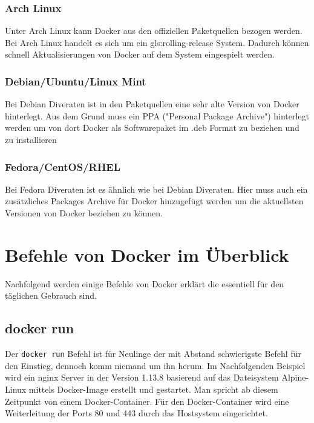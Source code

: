\subsubsection{Arch Linux}%
\label{sec:docker.installation.arch-linux}
Unter Arch Linux kann Docker aus den offiziellen Paketquellen bezogen werden. Bei Arch Linux handelt es sich um ein \Gls{gls:rolling-release} System. Dadurch können schnell Aktualisierungen von Docker auf dem System eingespielt werden.


\subsubsection{Debian/Ubuntu/Linux Mint}%
\label{sec:docker.installation.debian}
Bei Debian Diveraten ist in den Paketquellen eine sehr alte Version von Docker hinterlegt. Aus dem Grund muss ein PPA ("Personal Package Archive") hinterlegt werden um von dort Docker als Softwarepaket im .deb Format zu beziehen und zu installieren


\subsubsection{Fedora/CentOS/RHEL}%
\label{sec:docker.installation.fedora}
Bei Fedora Diveraten ist es ähnlich wie bei Debian Diveraten. Hier muss auch ein zusätzliches Packages Archive für Docker hinzugefügt werden um die aktuellsten Versionen von Docker beziehen zu können.


\section{Befehle von Docker im Überblick}%
\label{sec:docker-befehle}
Nachfolgend werden einige Befehle von Docker erklärt die essentiell für den täglichen Gebrauch sind.

\subsection{docker run}%
\label{sec:docker-befehle.run}
Der \texttt{docker run} Befehl ist für Neulinge der mit Abstand schwierigste Befehl für den Einstieg, dennoch komm niemand um ihn herum. Im Nachfolgenden Beispiel wird ein nginx Server in der Version 1.13.8 basierend auf das Dateisystem Alpine-Linux mittels Docker-Image erstellt und gestartet. Man spricht ab diesem Zeitpunkt von einem Docker-Container. Für den Docker-Container wird eine Weiterleitung der Ports 80 und 443 durch das Hostsystem eingerichtet.


